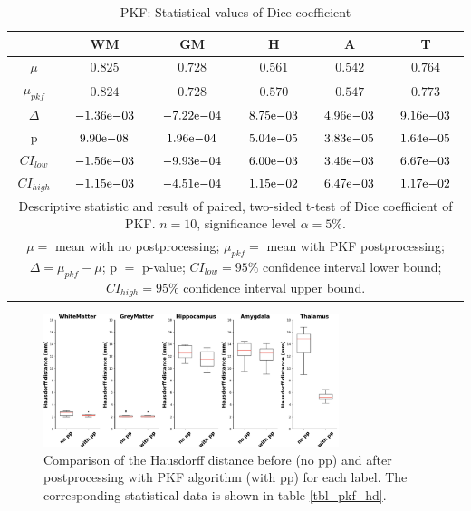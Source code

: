 \documentclass[journal]{IEEEtran}
\begin{document}
\begin{table}[ht]
\renewcommand{\arraystretch}{1.4}
\caption{PKF: Statistical values of Dice coefficient}
\label{tbl_pkf_dice}
\centering
\tabcolsep=0.11cm
\begin{tabular}{c|c|c|c|c|c}
\hline
 & WM & GM & H & A & T\\
\hline
$\mu$&$0.825$&$0.728$&$0.561$&$0.542$&$0.764$\\
$\mu_{pkf}$&$0.824$&$0.728$&$0.570$&$0.547$&$0.773$\\
$\Delta$&${-1.36}\mathrm{e}{-03}$&${-7.22}\mathrm{e}{-04}$&${8.75}\mathrm{e}{-03}$&${4.96}\mathrm{e}{-03}$&$9{.16}\mathrm{e}{-03}$\\
p&$	{9.90}\mathrm{e}{-08}$&${1.96}\mathrm{e}{-04}$&${5.04}\mathrm{e}{-05}$&$	{3.83}\mathrm{e}{-05}$&${1.64}\mathrm{e}{-05}$\\
$CI_{low}$&${-1.56}\mathrm{e}{-03}$&${-9.93}\mathrm{e}{-04}$&${6.00}\mathrm{e}{-03}$&$	{3.46}\mathrm{e}{-03}$&${6.67}\mathrm{e}{-03}$\\
$CI_{high}$&$	{-1.15}\mathrm{e}{-03}$&${-4.51}\mathrm{e}{-04}$&${1.15}\mathrm{e}{-02}$&$	{6.47}\mathrm{e}{-03}$&${1.17}\mathrm{e}{-02}$\\
\hline
\multicolumn{6}{p{3.4in}}{Descriptive statistic and result of paired, two-sided t-test of Dice coefficient of PKF. $n=10$, significance level $\alpha = 5\%$. }\\
\multicolumn{6}{p{3.4in}}{$\mu=$ mean with no postprocessing; $\mu_{pkf}=$ mean with PKF postprocessing; $\Delta=\mu_{pkf}-\mu$; p $=$ p-value;  $CI_{low}= 95\%$ confidence interval lower bound; $CI_{high}= 95\%$ confidence interval upper bound.}\\

\end{tabular}
\end{table}


\begin{figure}[ht]
\centering

\includegraphics[width=3.4in]{img/boxplots/PKF-HD.png}
\caption{Comparison of the Hausdorff distance before (no pp) and after postprocessing with PKF algorithm (with pp) for each label. The corresponding statistical data is shown in table \ref{tbl_pkf_hd}.
}
\label{fig_pkf-hd}
\end{figure}
\end{document}
